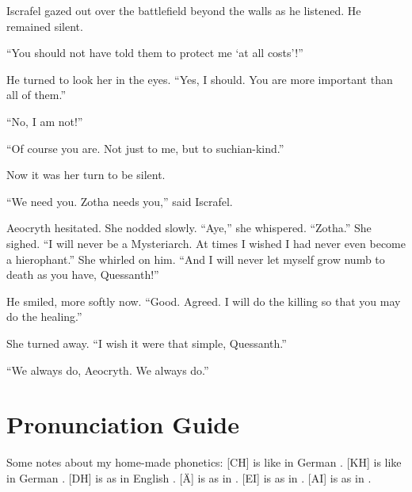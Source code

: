 \documentclass
  [a4paper,
   12pt,
   oneside
  ]%
  {article}
\begin{document}
Iscrafel gazed out over the battlefield beyond the walls as he listened. He remained silent. 

``You should not have told them to protect me `at all costs'!''

He turned to look her in the eyes.
``Yes, I should. You are more important than all of them.''

``No, I am not!''

``Of course you are. Not just to me, but to suchian-kind.''

Now it was her turn to be silent. 

``We need you. Zotha needs you,'' said Iscrafel.

Aeocryth hesitated. She nodded slowly. ``Aye,'' she whispered. ``Zotha.''
She sighed. 
``I will never be a Mysteriarch. At times I wished I had never even become a hierophant.'' 
She whirled on him. 
``And I will never let myself grow numb to death as you have, Quessanth!'' 

He smiled, more softly now. ``Good. Agreed. I will do the killing so that you may do the healing.''

She turned away. ``I wish it were that simple, Quessanth.''

``We always do, Aeocryth. We always do.''








\newpage
\appendix
\section{Pronunciation Guide}
Some notes about my home-made phonetics: 
[CH] is like in German . 
[KH] is like in German . 
[DH] is as in English . 
[Ä] is as in .
[EI] is as in .
[AI] is as in .    
\end{document}
